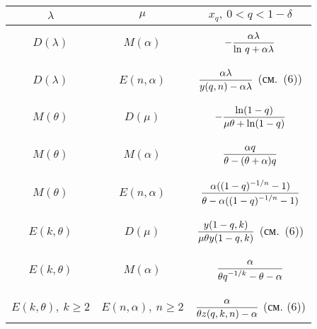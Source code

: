 \begin{multicols}{2}
\begin{table*}[b]
\begin{center}
\tabcolsep=7pt
\begin{tabular}{|c|c|c|}
\hline
$\lambda$&$\mu$&$x_q,\ 0<q<1-\delta$\\
\hline
&&\\[-9pt]
$D(\lambda)$&$M(\alpha)$&$-\displaystyle\displaystyle\frac{\displaystyle \alpha\lambda\mathstrut}{\displaystyle \ln\,q+\alpha\lambda\mathstrut}$\\
&&\\[-9pt]
\hline
&&\\[-9pt]
$D(\lambda)$&$E(n,\alpha)$&$\displaystyle\displaystyle\frac{\displaystyle \alpha\lambda\mathstrut}{\displaystyle y(q,n)-\alpha\lambda\mathstrut}$ (см.~(6))\\
&&\\[-9pt]
\hline
&&\\[-9pt]
$M(\theta)$&$D(\mu)$&$\displaystyle-\displaystyle\frac{\displaystyle \ln (1-q)\mathstrut}{\displaystyle \mu\theta+\ln (1-q)\mathstrut}$\\
&&\\[-9pt]
\hline
&&\\[-9pt]
$M(\theta)$&$M(\alpha)$&$\displaystyle\displaystyle\frac{\displaystyle \alpha q\mathstrut}{\displaystyle \theta-(\theta+\alpha)q\mathstrut}$\\
&&\\[-9pt]
\hline
&&\\[-9pt]
$M(\theta)$&$E(n,\alpha)$&$\displaystyle\displaystyle\frac{\displaystyle \alpha((1-q)^{-1/n}-1)\mathstrut}{\displaystyle \theta-\alpha((1-q)^{-1/n}-1)\mathstrut}$\\
&&\\[-9pt]
\hline
&&\\[-9pt]
$E(k,\theta)$&$D(\mu)$&$\displaystyle\displaystyle\frac{\displaystyle y(1-q,k)\mathstrut}{\displaystyle \mu\theta y(1-q,k)\mathstrut}$ (см.~(6))\\
&&\\[-9pt]
\hline
&&\\[-9pt]
$E(k,\theta)$&$M(\alpha)$&$\displaystyle\displaystyle\frac{\displaystyle \alpha\mathstrut}{\displaystyle \theta q^{-1/k}-\theta-\alpha\mathstrut}$\\
&&\\[-9pt]
\hline
&&\\[-9pt]
$E(k,\theta),\  k\ge2$&$E(n,\alpha),\  n\ge2$&$\displaystyle\frac{\displaystyle \alpha\mathstrut}{\displaystyle \theta z(q,k,n)-\alpha\mathstrut}$ (см. (6))\\
\hline
\end{tabular}
\end{center}
\end{table*}


\end{multicols}
